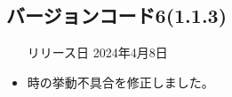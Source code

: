 \subsection*{バージョンコード6(1.1.3)}
\begin{itemize}
    \item[リリース日] 2024年4月8日
\end{itemize}

\new \par
\change \par
\fix
\begin{itemize}
    \item \nowplaying 時の挙動不具合を修正しました。
\end{itemize}